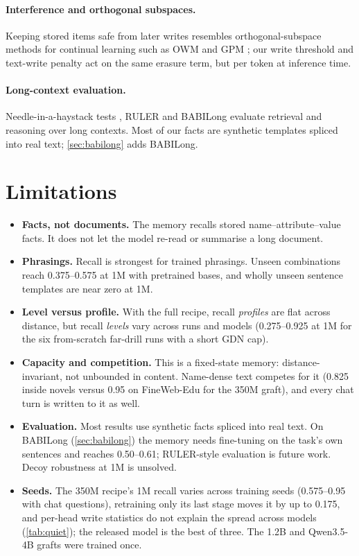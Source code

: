 \documentclass[11pt]{article}
\begin{document}
\paragraph{Interference and orthogonal subspaces.} Keeping stored items safe from later writes resembles orthogonal-subspace methods for continual learning such as OWM and GPM \citep{owm2019,gpm2021}; our write threshold and text-write penalty act on the same erasure term, but per token at inference time.

\paragraph{Long-context evaluation.} Needle-in-a-haystack tests \citep{niah2023}, RULER \citep{ruler2024} and BABILong \citep{babilong2024} evaluate retrieval and reasoning over long contexts. Most of our facts are synthetic templates spliced into real text; \cref{sec:babilong} adds BABILong.

\section{Limitations}
\label{sec:limitations}
\begin{itemize}
\item \textbf{Facts, not documents.} The memory recalls stored name--attribute--value facts. It does not let the model re-read or summarise a long document.
\item \textbf{Phrasings.} Recall is strongest for trained phrasings. Unseen combinations reach 0.375--0.575 at 1M with pretrained bases, and wholly unseen sentence templates are near zero at 1M.
\item \textbf{Level versus profile.} With the full recipe, recall \emph{profiles} are flat across distance, but recall \emph{levels} vary across runs and models (0.275--0.925 at 1M for the six from-scratch far-drill runs with a short GDN cap).
\item \textbf{Capacity and competition.} This is a fixed-state memory: distance-invariant, not unbounded in content. Name-dense text competes for it (0.825 inside novels versus 0.95 on FineWeb-Edu for the 350M graft), and every chat turn is written to it as well.
\item \textbf{Evaluation.} Most results use synthetic facts spliced into real text. On BABILong (\cref{sec:babilong}) the memory needs fine-tuning on the task's own sentences and reaches 0.50--0.61; RULER-style evaluation is future work. Decoy robustness at 1M is unsolved.
\item \textbf{Seeds.} The 350M recipe's 1M recall varies across training seeds (0.575--0.95 with chat questions), retraining only its last stage moves it by up to 0.175, and per-head write statistics do not explain the spread across models (\cref{tab:quiet}); the released model is the best of three. The 1.2B and Qwen3.5-4B grafts were trained once.
\end{itemize}
\end{document}
